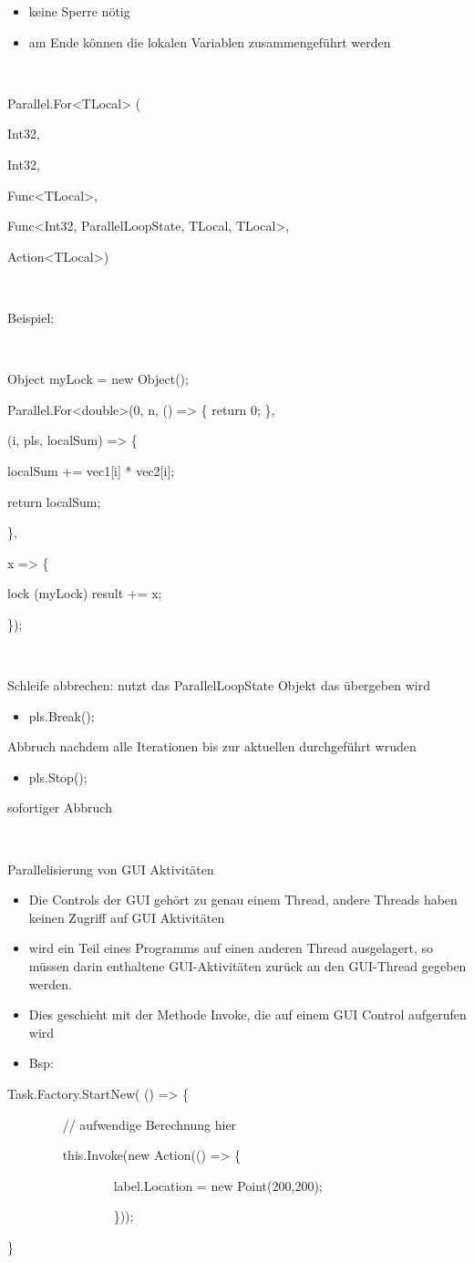 \begin{itemize}
\item keine Sperre nötig
\item am Ende können die lokalen Variablen zusammengeführt werden
\end{itemize}
~

Parallel.For{\textless}TLocal{\textgreater} (

Int32, 

Int32, 

Func{\textless}TLocal{\textgreater}, 

Func{\textless}Int32, ParallelLoopState, TLocal, TLocal{\textgreater}, 

Action{\textless}TLocal{\textgreater}) 

~

Beispiel: 

~

 Object myLock = new Object();

 Parallel.For{\textless}double{\textgreater}(0, n, () ={\textgreater} \{ return 0; \}, 

(i, pls, localSum) ={\textgreater}  \{

 localSum += vec1[i] * vec2[i];

 return localSum;

 \},

 x ={\textgreater}  \{

 lock (myLock) result += x;

 \});

~

Schleife abbrechen: nutzt das ParallelLoopState Objekt das übergeben wird

\begin{itemize}
\item pls.Break(); 
\end{itemize}
Abbruch nachdem alle Iterationen bis zur aktuellen durchgeführt wruden

\begin{itemize}
\item pls.Stop(); 
\end{itemize}
sofortiger Abbruch

~

Parallelisierung von GUI Aktivitäten

\begin{itemize}
\item Die Controls der GUI gehört zu genau einem Thread, andere Threads haben keinen Zugriff auf GUI Aktivitäten
\item wird ein Teil eines Programms auf einen anderen Thread ausgelagert, so müssen darin enthaltene GUI-Aktivitäten zurück an den GUI-Thread gegeben werden. 
\item Dies geschieht mit der Methode Invoke, die auf einem GUI Control aufgerufen wird
\item Bsp: 
\end{itemize}
Task.Factory.StartNew( () ={\textgreater} \{

~~~~~~~~ // aufwendige Berechnung hier

~~~~~~~~ this.Invoke(new Action(() ={\textgreater} \{

~~~~~~~~~~~~~~~~  label.Location = new Point(200,200);

~~~~~~~~~~~~~~~~  \}));

\}

~

~

~

~
\endinput
